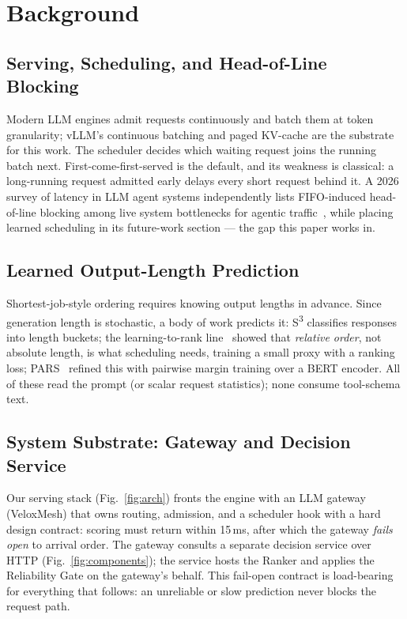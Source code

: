 \section{Background}

\subsection{Serving, Scheduling, and Head-of-Line Blocking}
Modern LLM engines admit requests continuously and batch them at
token granularity; vLLM's continuous batching and paged KV-cache are the
substrate for this work. The scheduler decides which waiting request joins
the running batch next. First-come-first-served is the default, and its
weakness is classical: a long-running request admitted early delays every
short request behind it. A 2026 survey of latency in LLM agent systems
independently lists FIFO-induced head-of-line blocking among live system
bottlenecks for agentic traffic~\cite{park2026minimizing}, while placing
learned scheduling in its future-work section --- the gap this paper works in.

\subsection{Learned Output-Length Prediction}
Shortest-job-style ordering requires knowing output lengths in
advance. Since generation length is stochastic, a body of work predicts it:
S\textsuperscript{3} classifies responses into length buckets; the
learning-to-rank line~\cite{fuLTR2024} showed that \emph{relative order},
not absolute length, is what scheduling needs, training a small proxy with a
ranking loss; PARS~\cite{tao2026ranking} refined this with pairwise margin
training over a BERT encoder. All of these read the prompt (or scalar request
statistics); none consume tool-schema text.

\subsection{System Substrate: Gateway and Decision Service}
Our serving stack (Fig.~\ref{fig:arch}) fronts the engine with an
LLM gateway (VeloxMesh) that owns routing, admission, and a scheduler hook
with a hard design contract: scoring must return within 15\,ms, after which
the gateway \emph{fails open} to arrival order. The gateway consults a
separate decision service over HTTP (Fig.~\ref{fig:components}); the service
hosts the Ranker and applies the Reliability Gate on the gateway's behalf.
This fail-open contract is load-bearing for everything that follows: an
unreliable or slow prediction never blocks the request path.

